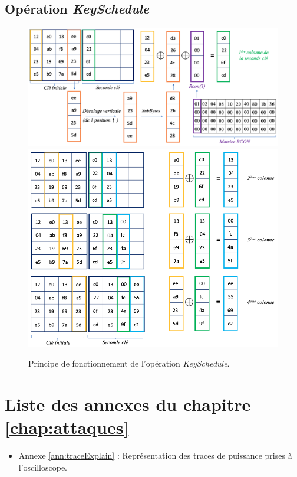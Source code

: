 \documentclass[oneside]{book}
\begin{document}
\begin{appendices}
\newpage

\section{Opération \textit{KeySchedule}}
\label{ann:KeySchedule}
\begin{figure}[htbp]
    \centering
    \includegraphics[scale=0.35]{image/KeySchedule1}
    \includegraphics[scale=0.45]{image/KeySchedule2}
    \caption{Principe de fonctionnement de l'opération \textit{KeySchedule}.}
    \label{fig:KeySchedule1}
\end{figure}

\newpage


\chapter{Liste des annexes du chapitre \ref{chap:attaques}}
\begin{itemize}
\item Annexe \ref{ann:traceExplain} : Représentation des traces de puissance prises à l'oscilloscope.
\end{itemize}


\end{appendices}
\end{document}
